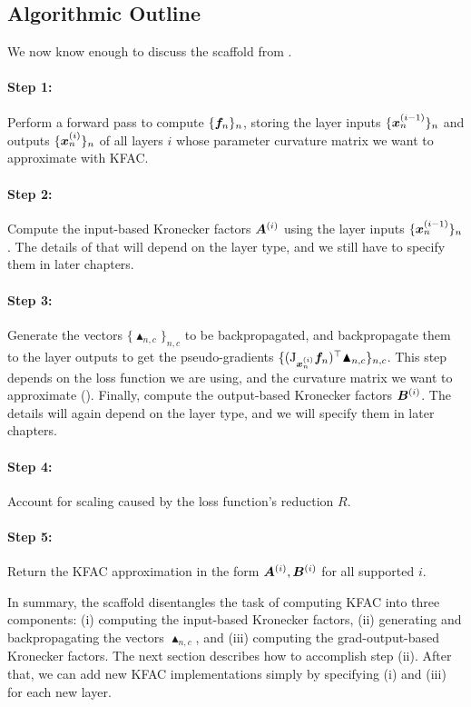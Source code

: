 \subsection{Algorithmic Outline}

We now know enough to discuss the scaffold from .

\paragraph{Step 1:} Perform a forward pass to compute $\{{\bm{f}}_n\}_n $, storing the layer inputs $\{{\bm{x}}_n^{(i-1)} \}_n$ and outputs $\{{\bm{x}}_n^{(i)}\}_n$ of all layers $i$ whose parameter curvature matrix we want to approximate with KFAC.

\paragraph{Step 2:} Compute the input-based Kronecker factors ${\bm{A}}^{(i)}$ using the layer inputs $\{{\bm{x}}_n^{(i-1)}\}_n$.
The details of that will depend on the layer type, and we still have to specify them in later chapters.

\paragraph{Step 3:} Generate the vectors $\{\blacktriangle_{n,c}\}_{n,c}$ to be backpropagated, and backpropagate them to the layer outputs to get the pseudo-gradients $\{(\mathrm{J}_{{\bm{x}}_n^{(i)}} {\bm{f}}_n)^{\top} \blacktriangle_{n,c} \}_{n,c}$.
This step depends on the loss function we are using, and the curvature matrix we want to approximate ().
Finally, compute the output-based Kronecker factors ${\bm{B}}^{(i)}$.
The details will again depend on the layer type, and we will specify them in later chapters.

\paragraph{Step 4:} Account for scaling caused by the loss function's reduction $R$.

\paragraph{Step 5:} Return the KFAC approximation in the form ${\bm{A}}^{(i)}, {\bm{B}}^{(i)}$ for all supported $i$.

In summary, the scaffold disentangles the task of computing KFAC into three components: (i) computing the input-based Kronecker factors, (ii) generating and backpropagating the vectors $\blacktriangle_{n,c}$, and (iii) computing the grad-output-based Kronecker factors.
The next section describes how to accomplish step (ii).
After that, we can add new KFAC implementations simply by specifying (i) and (iii) for each new layer.

